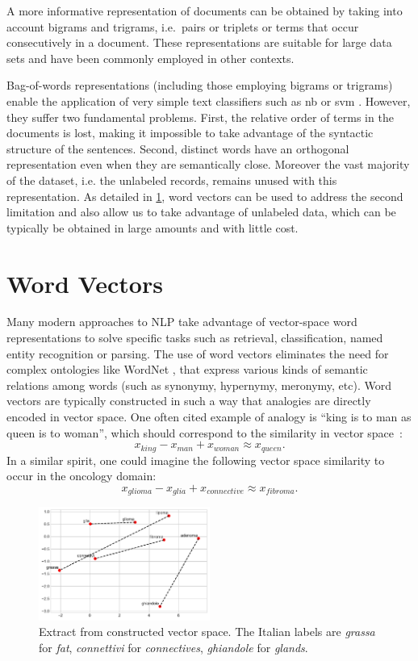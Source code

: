 A more informative representation of documents can be obtained by
taking into account bigrams and trigrams, i.e.\ pairs or triplets or
terms that occur consecutively in a document. These representations
are suitable for large data sets and have been commonly employed in
other contexts.

Bag-of-words representations (including those employing bigrams or
trigrams) enable the application of very simple text classifiers such
as \ac{nb} or \ac{svm} \cite{cortes-support-1995}. However, they
suffer two fundamental problems. First, the relative order of terms in
the documents is lost, making it impossible to take advantage of the
syntactic structure of the sentences. Second, distinct words have an
orthogonal representation even when they are semantically
close. Moreover the vast majority of the dataset, i.e. the unlabeled
records, remains unused with
this representation. As detailed in \cref{sec:word-vectors}, word
vectors can be used to address the second limitation and also allow us
to take advantage of unlabeled data, which can be typically be
obtained in large amounts and with little cost.

\section{Word Vectors}
\label{sec:word-vectors}
Many modern approaches to NLP take advantage of vector-space word
representations to solve specific tasks such as retrieval,
classification, named entity recognition or parsing. %
The use of word vectors eliminates the need for complex ontologies
like WordNet \cite{fellbaum-wordnet-1998}, that express various kinds of semantic relations among
words (such as synonymy, hypernymy, meronymy, etc). Word vectors are
typically constructed in such a way that analogies are directly
encoded in vector space. One often cited example of analogy is ``king
is to man as queen is to woman'', which should correspond to the
similarity in vector space~\cite{mikolov_linguistic_2013}:
$$
x_\mathit{king}-x_\mathit{man}+x_\mathit{woman} \approx x_\mathit{queen}.
$$
In a similar spirit, one could imagine the following vector space
similarity to occur in the oncology domain:
$$
x_\mathit{glioma}-x_\mathit{glia}+x_\mathit{connective} \approx
x_\mathit{fibroma}.
$$
\begin{figure}
  \centering
  \includegraphics[width=0.5\textwidth]{img/gloveGraph.pdf}
  \caption{Extract from constructed vector space. The Italian labels
    are \emph{grassa} for \emph{fat}, \emph{connettivi} for
    \emph{connectives}, \emph{ghiandole} for \emph{glands}.}
  \label{fig:gloveGraph}
\end{figure}

